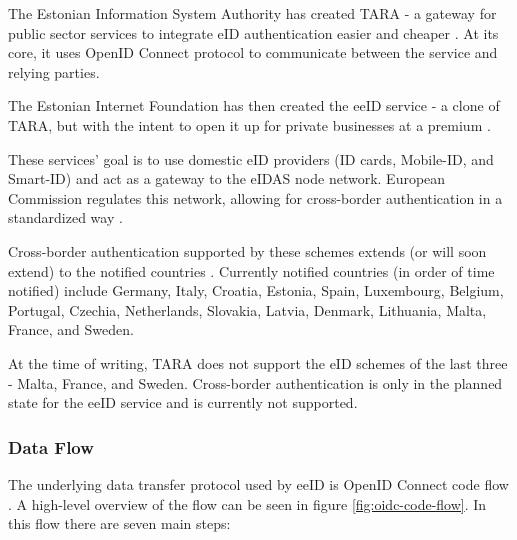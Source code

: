 The Estonian Information System Authority has created TARA - a gateway for public sector services to integrate eID authentication easier and cheaper \cite{tara-business}. At its core, it uses OpenID Connect \cite{tara-technical} protocol to communicate between the service and relying parties.

The Estonian Internet Foundation has then created the eeID service - a clone of TARA, but with the intent to open it up for private businesses at a premium \cite{eeid}.

These services' goal is to use domestic eID providers (ID cards, Mobile-ID, and Smart-ID) and act as a gateway to the eIDAS node network. European Commission regulates this network, allowing for cross-border authentication in a standardized way \cite{eulaw-eidas}.

Cross-border authentication supported by these schemes extends (or will soon extend) to the notified countries \cite{eulaw-eidas-notified}. Currently notified countries (in order of time notified) include Germany, Italy, Croatia, Estonia, Spain, Luxembourg, Belgium, Portugal, Czechia, Netherlands, Slovakia, Latvia, Denmark, Lithuania, Malta, France, and Sweden.

At the time of writing, TARA does not support the eID schemes of the last three - Malta, France, and Sweden. Cross-border authentication is only in the planned state for the eeID service and is currently not supported.

\subsubsection{Data Flow}

The underlying data transfer protocol used by eeID is OpenID Connect code flow \cite{tara-technical, oidc}. A high-level overview of the flow can be seen in figure \ref{fig:oidc-code-flow}. In this flow there are seven main steps:

